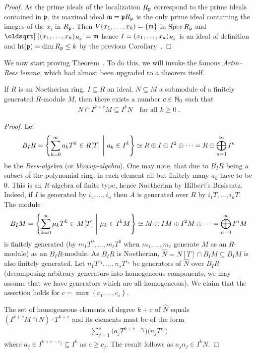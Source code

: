 \documentclass[a4paper,parskip=half,numbers=enddot, DIV=12]{scrreprt}
\begin{document}
\begin{proof}
    As the prime ideals of the localization $R_{\mathfrak{p}}$ correspond to the prime ideals contained in $\mathfrak{p}$, its maximal ideal $\mathfrak{m}=\mathfrak{p} R_{\mathfrak{p}}$ is the only prime ideal containing the images of the $x_i$ in $R_{\mathfrak{p}}$. Then $V(x_1,\ldots, x_k) =\{\mathfrak{m}\}$ in $\operatorname{Spec} R_{\mathfrak{p}}$ and $\sqrt{(x_1,\ldots,x_k)_{R_\pp}}=\mm$ hence $I=(x_1,\ldots, x_k)_{R_{\mathfrak{p}}}$ is an ideal of definition and $\operatorname{ht}(\mathfrak{p})=\dim R_{\mathfrak{p}} \leq k$ by the previous Corollary~.
\end{proof}
We now start proving Theorem~. To do this, we will invoke the famous \emph{Artin--Rees lemma}, which had almost been upgraded to a theorem itself.
\begin{prop} 
    If $R$ is an Noetherian ring, $I\subseteq R$ an ideal, $N\subseteq M$ a submodule of a finitely generated $R$-module $M$, then there exists a number $c\in\mathbb{N}_0$ such that 
    \begin{align*}
    	N\cap I^{k+c}M \subseteq I^kN\quad\text{for all }k\geq 0\;. 
    \end{align*}
\end{prop}
\begin{proof}
    Let 
    \begin{align*}
        B_IR = \left\{\sum_{k=0}^\infty a_kT^k\in R[T] \ \middle|\  a_k\in I^k\right\}\simeq R\oplus I\oplus I^2\oplus\cdots= R\oplus\bigoplus_{n=1}^\infty I^n
    \end{align*}
    be the \emph{Rees-algebra} (or \emph{blowup-algebra}). One may note, that due to $B_IR$ being a subset of the polynomial ring, in each element all but finitely many $a_k$ have to be $0$. This is an $R$-algebra of finite type, hence Noetherian by Hilbert's Basissatz. Indeed, if $I$ is generated by $i_1,\ldots,i_n$ then $A$ is generated over $R$ by $i_1T,\ldots,i_nT$. The module 
    \begin{align*}
        B_IM = \left\{\sum_{k=0}^\infty \mu_kT^k\in M[T] \ \middle|\  \mu_k \in I^kM\right\}\simeq M\oplus IM\oplus I^2M\oplus\cdots=\bigoplus_{n=0}^\infty I^nM
    \end{align*}
    is finitely generated (by $m_1T^0,\ldots,m_\ell T^0$ when $m_1,\ldots,m_\ell$ generate $M$ as an $R$-module) as an $B_IR$-module. As $B_IR$ is Noetherian, $\widehat N = N[T]\cap B_IM \subseteq B_IM$ is also finitely generated. Let $n_1T^{c_1},\ldots,n_sT^{c_s}$ be generators of $\widehat N$ over $B_IR$ (decomposing arbitrary generators into homogeneous components, we may assume that we have generators which are all homogeneous). We claim that the assertion holds for $c = \max\left\{c_1,\ldots,c_s\right\}$. 
    
    The set of homogeneous elements of degree $k+c$ of $\widehat N$ equals $(I^{k+c}M\cap N)\cdot T^{k+c}$ and its elements must be of the form
    \begin{align*}
        \sum_{j = 1}^s \big(a_j T^{k+c-c_j}\big)\big(n_j T^{c_j}\big)
    \end{align*}
    where $a_j \in I^{k+c-c_j} \subseteq I^k$ as $c\geq c_j$. The result follows as $a_j n_j \in I^k N$.
\end{proof}
\end{document}
